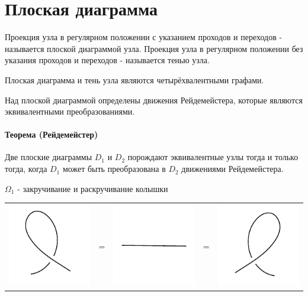 \section{Плоская диаграмма}

Проекция узла в регулярном положении с указанием проходов и переходов - называется плоской диаграммой узла.
Проекция узла в регулярном положении без указания проходов и переходов - называется тенью узла. 

Плоская диаграмма и тень узла являются четырёхвалентными графами.

Над плоской диаграммой определены движения Рейдемейстера, которые являются эквивалентными преобразованиями.

\paragraph{Теорема (Рейдемейстер)} Две плоские диаграммы $D_1$ и $D_2$ порождают эквивалентные узлы тогда и только тогда, когда $D_1$ может быть преобразована в $D_2$ движениями Рейдемейстера.



\graphicspath{{\currentpath}}

$\Omega_1$ - закручивание и раскручивание колышки

\begin{tabular}{
>{\centering\arraybackslash}m{3cm}>{\centering\arraybackslash}m{0.4cm}
>{\centering\arraybackslash}m{3cm}>{\centering\arraybackslash}m{0.4cm}
>{\centering\arraybackslash}m{3cm}
}
\includegraphics{images/close-loop-l.pdf}
&
=
&
\includegraphics{images/line.pdf}
&
=
&
\includegraphics{images/close-loop-r.pdf}
\end{tabular}

